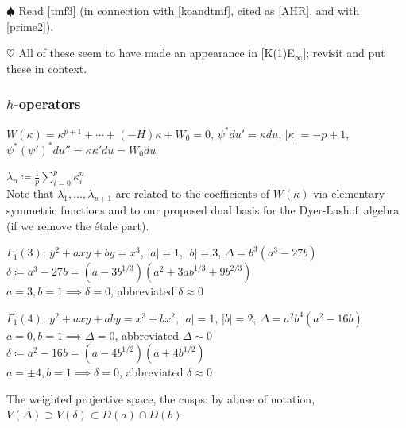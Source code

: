 \documentclass{rs}
\theoremstyle{definition}
\theoremstyle{remark}
\newcommand{\DL}{Dyer-Lashof~}
\renewcommand{\D}{\Delta}
\renewcommand{\d}{\delta}
\newcommand{\G}{\Gamma}
\newcommand{\K}{\kappa}
\renewcommand{\l}{\lambda}
\newcommand{\ce}{\coloneqq}
\newcommand{\todo}{\spadesuit}
\newcommand{\totodo}{\heartsuit}
\renewcommand{\=}{\approx}
\renewcommand{\-}{\sim}
\numberwithin{equation}{section}
\numberwithin{thm}{section}
\begin{document}
$\todo$ Read [tmf3] (in connection with [koandtmf], cited as [AHR], and with [prime2]).  

$\totodo$ All of these seem to have made an appearance in [K(1)E$_\infty$]; revisit and put these in context.  


\subsubsection{$h$-operators}
\label{subsubsec:h-opr}

$W(\K) = \K^{p + 1} + \cdots + (-H) \K + W_0 = 0$, $\psi^* du' = \K du$, $|\K| = -p + 1$, $\psi^* (\psi')^* du'' = \K \K' du = W_0 du$ 

$\displaystyle \l_n \ce \frac{1}{p} \sum_{i=0}^p \K_i^n$ \\
Note that $\l_1, \ldots, \l_{p+1}$ are related to the coefficients of $W(\K)$ via elementary symmetric functions 
and to our proposed dual basis for the \DL algebra (if we remove the \'etale part).  

$\G_1(3)$: $y^2 + a x y + b y = x^3$, $|a| = 1$, $|b| = 3$, $\Delta = b^3 (a^3 - 27 b)$ \\
$\d \ce a^3 - 27 b = (a - 3 b^{1/3}) (a^2 + 3 a b^{1/3} + 9 b^{2/3})$ \\
$a = 3, b = 1 \implies \d = 0$, abbreviated $\d \= 0$ 

$\G_1(4)$: $y^2 + a x y + a b y = x^3 + b x^2$, $|a| = 1$, $|b| = 2$, $\Delta = a^2 b^4 (a^2 - 16 b)$ \\
$a = 0, b = 1 \implies \D = 0$, abbreviated $\D \- 0$ \\
$\d \ce a^2 - 16 b = (a - 4 b^{1/2}) (a + 4 b^{1/2})$ \\
$a = \pm4, b = 1 \implies \d = 0$, abbreviated $\d \= 0$ 

The weighted projective space, the cusps: by abuse of notation, $V(\D) \supset V(\d) \subset D(a) \cap D(b)$.  
\end{document}
